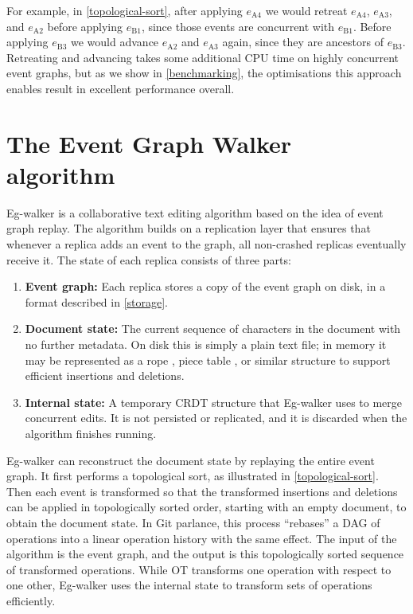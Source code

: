 \documentclass[sigplan,10pt]{acmart}
\newcommand{\algname}{Eg-walker\xspace}
\begin{document}
For example, in \autoref{topological-sort}, after applying $e_\mathrm{A4}$ we would retreat $e_\mathrm{A4}$, $e_\mathrm{A3}$, and $e_\mathrm{A2}$ before applying $e_\mathrm{B1}$, since those events are concurrent with $e_\mathrm{B1}$.
Before applying $e_\mathrm{B3}$ we would advance $e_\mathrm{A2}$ and $e_\mathrm{A3}$ again, since they are ancestors of $e_\mathrm{B3}$.
Retreating and advancing takes some additional CPU time on highly concurrent event graphs, but as we show in \autoref{benchmarking}, the optimisations this approach enables result in excellent performance overall.

\section{The Event Graph Walker algorithm}\label{algorithm}

\algname is a collaborative text editing algorithm based on the idea of event graph replay.
The algorithm builds on a replication layer that ensures that whenever a replica adds an event to the graph, all non-crashed replicas eventually receive it.
The state of each replica consists of three parts:

\begin{enumerate}
\item \textbf{Event graph:} Each replica stores a copy of the event graph on disk, in a format described in \autoref{storage}.
\item \textbf{Document state:} The current sequence of characters in the document with no further metadata. On disk this is simply a plain text file; in memory it may be represented as a rope \cite{Boehm1995}, piece table \cite{vscode-buffer}, or similar structure to support efficient insertions and deletions.
\item \textbf{Internal state:} A temporary CRDT structure that \algname uses to merge concurrent edits. It is not persisted or replicated, and it is discarded when the algorithm finishes running.
\end{enumerate}

\algname can reconstruct the document state by replaying the entire event graph.
It first performs a topological sort, as illustrated in \autoref{topological-sort}. Then each event is transformed so that the transformed insertions and deletions can be applied in topologically sorted order, starting with an empty document, to obtain the document state.
In Git parlance, this process ``rebases'' a DAG of operations into a linear operation history with the same effect.
The input of the algorithm is the event graph, and the output is this topologically sorted sequence of transformed operations.
While OT transforms one operation with respect to one other, \algname uses the internal state to transform sets of operations efficiently.
\end{document}
